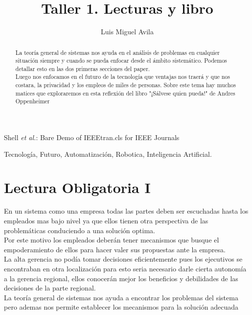 \documentclass[journal]{IEEEtran}
\begin{document}
%

\title{Taller 1. Lecturas y libro}

\author{Luis Miguel Avila}

{Shell \MakeLowercase{\textit{et al.}}: Bare Demo of IEEEtran.cls for IEEE Journals}


\maketitle

\begin{abstract}
La teoría general de sistemas nos ayuda en el análisis de problemas en cualquier situación siempre y cuando se pueda enfocar desde el ámbito sistemático. Podemos detallar esto en las dos primeras secciones del paper.\\
Luego nos enfocamos en el futuro de la tecnología que ventajas nos traerá y que nos costara, la privacidad y los empleos de miles de personas. Sobre este tema hay muchos matices que exploraremos en esta reflexión del libro "¡Sálvese quien pueda!" de Andres Oppenheimer
\end{abstract}


\begin{IEEEkeywords}
Tecnología, Futuro, Automatización, Robotica, Inteligencia Artificial.
\end{IEEEkeywords}

\IEEEpeerreviewmaketitle

\section{Lectura Obligatoria I}

En un sistema como una empresa todas las partes deben ser escuchadas hasta los empleados mas bajo nivel ya que ellos tienen otra perspectiva de las problemáticas conduciendo a una solución optima.\\Por este motivo los empleados deberán tener mecanismos que busque el empoderamiento de ellos para hacer valer sus propuestas ante la empresa.\\La alta gerencia no podía tomar decisiones eficientemente pues los ejecutivos se encontraban en otra localización para esto seria necesario darle cierta autonomía a la gerencia regional, ellos conocerán mejor los beneficios y debilidades de las decisiones de la parte regional.\\La teoría general de sistemas nos ayuda a encontrar los problemas del sistema pero ademas nos permite establecer los mecanismos para la solución adecuada
\end{document}
